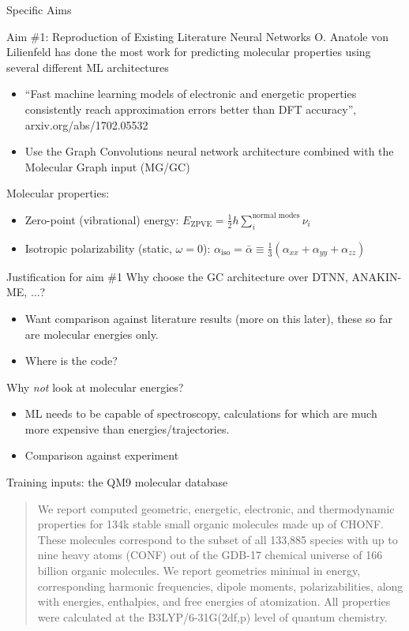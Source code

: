 \documentclass[xetex,compress]{beamer}
\begin{document}
\begin{frame}{Specific Aims}
\end{frame}

\begin{frame}{Aim \#1: Reproduction of Existing Literature Neural Networks}
  O. Anatole von Lilienfeld has done the most work for predicting molecular properties using several different ML architectures
  \begin{itemize}
  \item ``Fast machine learning models of electronic and energetic properties consistently reach approximation errors better than DFT accuracy'', arxiv.org/abs/1702.05532
  \item Use the Graph Convolutions neural network architecture combined with the Molecular Graph input (MG/GC)
  \end{itemize}
  Molecular properties:
  \begin{itemize}
  \item Zero-point (vibrational) energy: \(E_{\text{ZPVE}} = \frac{1}{2} h \sum_{i}^{\text{normal modes}} \nu_{i}\)
  \item Isotropic polarizability (static, \(\omega = 0\)): \(\alpha_{\text{iso}} = \bar{\alpha} \equiv \frac{1}{3} (\alpha_{xx} + \alpha_{yy} + \alpha_{zz})\)
  \end{itemize}
\end{frame}

\begin{frame}{Justification for aim \#1}
  Why choose the GC architecture over DTNN, ANAKIN-ME, ...?
  \begin{itemize}
  \item Want comparison against literature results (more on this later), these so far are molecular energies only.
  \item Where is the code?
  \end{itemize}
  Why \emph{not} look at molecular energies?
  \begin{itemize}
  \item ML needs to be capable of spectroscopy, calculations for which are much more expensive than energies/trajectories.
  \item Comparison against experiment
  \end{itemize}
\end{frame}

\begin{frame}{Training inputs: the QM9 molecular database}
  \begin{quote}
    We report computed geometric, energetic, electronic, and thermodynamic properties for 134k stable small organic molecules made up of CHONF. These molecules correspond to the subset of all 133,885 species with up to nine heavy atoms (CONF) out of the GDB-17 chemical universe of 166 billion organic molecules. We report geometries minimal in energy, corresponding harmonic frequencies, dipole moments, polarizabilities, along with energies, enthalpies, and free energies of atomization. All properties were calculated at the B3LYP/6-31G(2df,p) level of quantum chemistry.
  \end{quote}
\end{frame}
\end{document}
